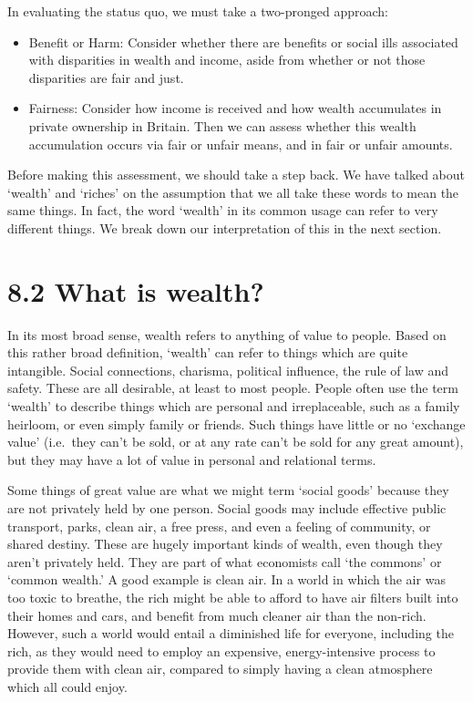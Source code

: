 \documentclass[]{tufte-handout}
\providecommand{\tightlist}{%
  \setlength{\itemsep}{0pt}\setlength{\parskip}{0pt}}
\begin{document}
In evaluating the status quo, we must take a two-pronged approach:

\begin{itemize}
\tightlist
\item
  Benefit or Harm: Consider whether there are benefits or social ills
  associated with disparities in wealth and income, aside from whether
  or not those disparities are fair and just.
\item
  Fairness: Consider how income is received and how wealth accumulates
  in private ownership in Britain. Then we can assess whether this
  wealth accumulation occurs via fair or unfair means, and in fair or
  unfair amounts.
\end{itemize}

Before making this assessment, we should take a step back. We have
talked about `wealth' and `riches' on the assumption that we all take
these words to mean the same things. In fact, the word `wealth' in its
common usage can refer to very different things. We break down our
interpretation of this in the next section.

\hypertarget{what-is-wealth}{%
\section{8.2 What is wealth?}\label{what-is-wealth}}

In its most broad sense, wealth refers to anything of value to people.
Based on this rather broad definition, `wealth' can refer to things
which are quite intangible. Social connections, charisma, political
influence, the rule of law and safety. These are all desirable, at least
to most people. People often use the term `wealth' to describe things
which are personal and irreplaceable, such as a family heirloom, or even
simply family or friends. Such things have little or no `exchange value'
(i.e.~they can't be sold, or at any rate can't be sold for any great
amount), but they may have a lot of value in personal and relational
terms.

Some things of great value are what we might term `social goods' because
they are not privately held by one person. Social goods may include
effective public transport, parks, clean air, a free press, and even a
feeling of community, or shared destiny. These are hugely important
kinds of wealth, even though they aren't privately held. They are part
of what economists call `the commons' or `common wealth.' A good example
is clean air. In a world in which the air was too toxic to breathe, the
rich might be able to afford to have air filters built into their homes
and cars, and benefit from much cleaner air than the non-rich. However,
such a world would entail a diminished life for everyone, including the
rich, as they would need to employ an expensive, energy-intensive
process to provide them with clean air, compared to simply having a
clean atmosphere which all could enjoy.
\end{document}
